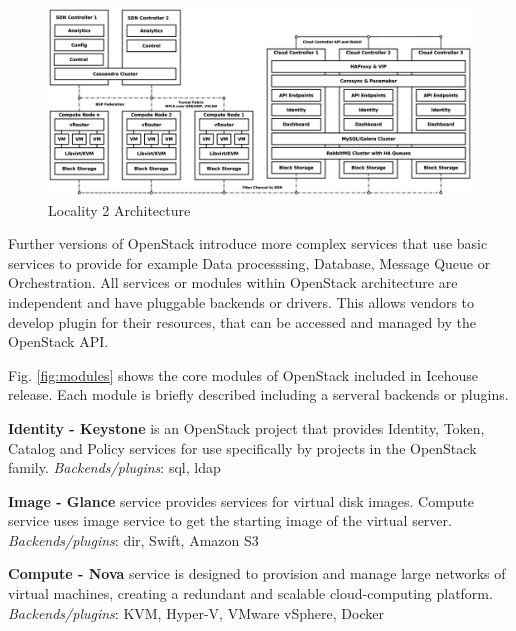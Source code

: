 \begin{figure}[!h]
\centering
\includegraphics[scale=.15]{img/use_case_ha_sdn.eps}
\caption{Locality 2 Architecture}
\label{fig:pisek}
\end{figure}


Further versions of OpenStack introduce more complex services that use basic services to provide for example Data processsing, Database, Message Queue  or Orchestration. All services or modules within OpenStack architecture are independent and have pluggable backends or drivers. This allows vendors to develop plugin for their resources, that can be accessed and managed by the OpenStack API.

Fig. \ref{fig:modules} shows the core modules of OpenStack included in Icehouse release. Each module is briefly described including a serveral backends or plugins.





\textbf{Identity - Keystone} is an OpenStack project that provides Identity, Token, Catalog and Policy services for use specifically by projects in the OpenStack family. 
\textit{Backends/plugins}: sql, ldap

\textbf{Image - Glance} service provides services for virtual disk images. Compute service uses image service to get the starting image of the virtual server.
\textit{Backends/plugins}: dir, Swift, Amazon S3

\textbf{Compute - Nova} service is designed to provision and manage large networks of virtual machines, creating a redundant and scalable cloud-computing platform. 
\textit{Backends/plugins}: KVM, Hyper-V, VMware vSphere, Docker

